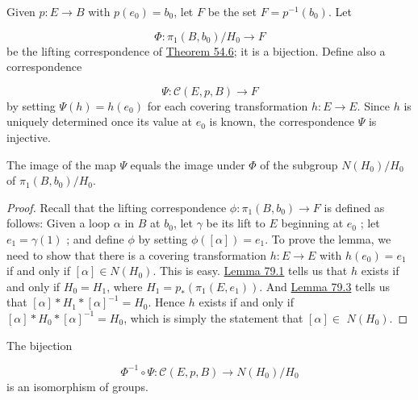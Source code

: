 \begin{definition}
	Given \(p : E \rightarrow B\) with \(p( e_{0}) = b_{0}\), let \(F\) be the set \(F = p^{-1}( b_{0})\). Let

\[
\Phi : {\pi }_{1}( {B,b_{0}}) /H_{0} \rightarrow F
\]
be the lifting correspondence of \hyperref[thm:54.6]{Theorem 54.6}; it is a bijection. Define also a correspondence

\[
\Psi : \mathcal{C}( {E,p,B}) \rightarrow F
\]
by setting \(\Psi ( h) = h( e_{0})\) for each covering transformation \(h : E \rightarrow E\). Since \(h\) is uniquely determined once its value at \(e_{0}\) is known, the correspondence \(\Psi\) is injective.
\end{definition}

\begin{lemma}
\label{lem:\thetheorem}
	The image of the map \(\Psi\) equals the image under \(\Phi\) of the subgroup \(N( H_{0}) /H_{0}\) of \({\pi }_{1}( {B,b_{0}}) /H_{0}\).
\end{lemma}

\begin{proof}
	Recall that the lifting correspondence \(\phi : {\pi }_{1}( {B,b_{0}}) \rightarrow F\) is defined as follows: Given a loop \(\alpha\) in \(B\) at \(b_{0}\), let \(\gamma\) be its lift to \(E\) beginning at \(e_{0}\) ; let \(e_{1} = \gamma (1)\) ; and define \(\phi\) by setting \(\phi ( [ \alpha ] ) = e_{1}\). To prove the lemma, we need to show that there is a covering transformation \(h : E \rightarrow E\) with \(h( e_{0}) = e_{1}\) if and only if \([ \alpha ] \in N( H_{0})\).
This is easy. \hyperref[lem:79.1]{Lemma 79.1} tells us that \(h\) exists if and only if \(H_{0} = H_{1}\), where \(H_{1} = p_{ * }( {{\pi }_{1}( {E,e_{1}}) })\). And \hyperref[lem:79.3]{Lemma 79.3} tells us that \([ \alpha ] * H_{1} * {[ \alpha ] }^{-1} = H_{0}\). Hence \(h\) exists if and only if \([ \alpha ] * H_{0} * {[ \alpha ] }^{-1} = H_{0}\), which is simply the statement that \([ \alpha ] \in\) \(N( H_{0})\).
\end{proof}
\begin{theorem}
\label{thm:\thetheorem}
	The bijection

\[
{\Phi }^{-1} \circ \Psi : \mathcal{C}( {E,p,B}) \rightarrow N( H_{0}) /H_{0}
\]
is an isomorphism of groups.
\end{theorem}

